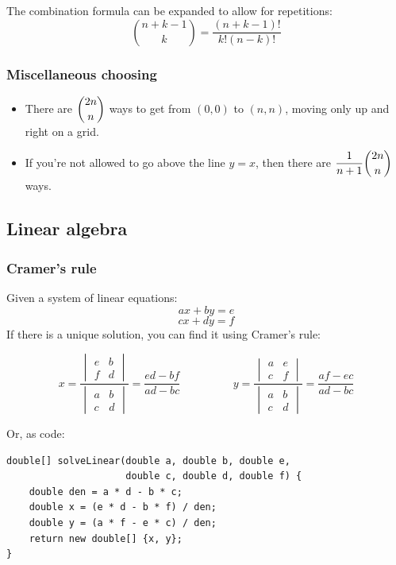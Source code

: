 \documentclass[a4paper,12pt]{article}
\begin{document}
The combination formula can be expanded to allow for repetitions:
\[{{n + k - 1}\choose k}=\frac{(n+k-1)!}{k!(n-k)!}\]

\subsubsection{Miscellaneous choosing}
\begin{itemize}
\item There are $\dbinom{2n}{n}$ ways to get from $(0,0)$ to $(n,n)$, moving only up and right on a grid.
\item If you're not allowed to go above the line $y=x$, then there are $\dfrac{1}{n+1}\dbinom{2n}{n}$ ways.
\end{itemize}

\subsection{Linear algebra}
\subsubsection{Cramer's rule}
Given a system of linear equations:
\[ax + by = e\]
\[cx + dy = f\]
\noindent If there is a unique solution, you can find it using Cramer's rule:

\[
x = \frac{\begin{vmatrix}e & b \\ f & d\end{vmatrix}}{\begin{vmatrix}a & b \\ c & d\end{vmatrix}} = \frac{ed-bf}{ad-bc}
\hspace{2cm}
y = \frac{\begin{vmatrix}a & e \\ c & f\end{vmatrix}}{\begin{vmatrix}a & b \\ c & d\end{vmatrix}} = \frac{af-ec}{ad-bc}
\]

\noindent Or, as code:

\begin{lstlisting}
double[] solveLinear(double a, double b, double e,
					 double c, double d, double f) {
	double den = a * d - b * c;
	double x = (e * d - b * f) / den;
	double y = (a * f - e * c) / den;
	return new double[] {x, y};
}
\end{lstlisting}
\end{document}
